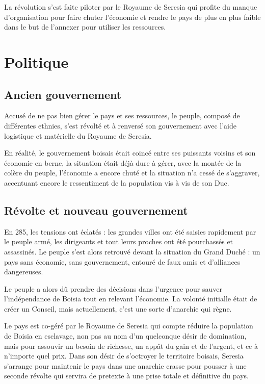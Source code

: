 \documentclass[french, a4paper, 12pt]{article}
\begin{document}
La révolution s'est faite piloter par le Royaume de Seresia qui profite du manque d'organisation pour faire chuter l'économie et rendre le pays de plus en plus faible dans le but de l'annexer pour utiliser les ressources.

\section{Politique}

\subsection{Ancien gouvernement}

Accusé de ne pas bien gérer le pays et ses ressources, le peuple, composé de différentes ethnies, s'est révolté et à renversé son gouvernement avec l'aide logistique et matérielle du Royaume de Seresia.

En réalité, le gouvernement boisais était coincé entre ses puissants voisins et son économie en berne, la situation était déjà dure à gérer, avec la montée de la colère du peuple, l'économie a encore chuté et la situation n'a cessé de s'aggraver, accentuant encore le ressentiment de la population vis à vis de son Duc.

\subsection{Révolte et nouveau gouvernement}

En 285, les tensions ont éclatés : les grandes villes ont été saisies rapidement par le peuple armé, les dirigeants et tout leurs proches ont été pourchassés et assassinés. Le peuple s'est alors retrouvé devant la situation du Grand Duché : un pays sans économie, sans gouvernement, entouré de faux amis et d'alliances dangereuses.

Le peuple a alors dû prendre des décisions dans l'urgence pour sauver l'indépendance de Boisia tout en relevant l'économie. La volonté initialle était de créer un Conseil, mais actuellement, c'est une sorte d'anarchie qui règne.

Le pays est co-géré par le Royaume de Seresia qui compte réduire la population de Boisia en esclavage, non pas au nom d'un quelconque désir de domination, mais pour assouvir un besoin de richesse, un appât du gain et de l'argent, et ce à n'importe quel prix. Dans son désir de s'octroyer le territoire boisais, Seresia s'arrange pour maintenir le pays dans une anarchie crasse pour pousser à une seconde révolte qui servira de pretexte à une prise totale et définitive du pays.
\end{document}
